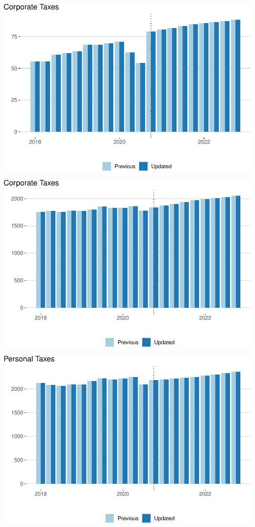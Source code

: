 \documentclass[
]{article}
\begin{document}
\begin{center}\includegraphics{update-changes-levels_files/figure-latex/state-corporate-tax-1} \end{center}

\begin{center}\includegraphics{update-changes-levels_files/figure-latex/state-noncorporate-tax-1} \end{center}

\begin{center}\includegraphics{update-changes-levels_files/figure-latex/personal-tax-1} \end{center}
\end{document}

